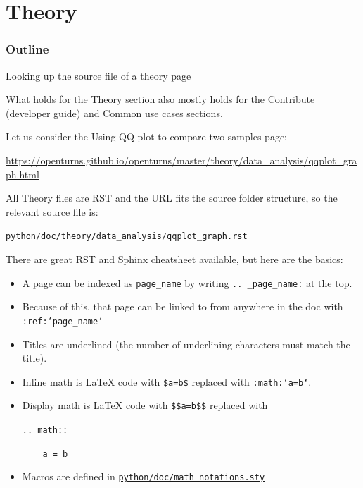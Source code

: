\documentclass[8pt, handout]{beamer}
\begin{document}
\section{Theory}

\begin{frame}[label=tableofcontents]
\frametitle{Outline}
\tableofcontents[currentsection]
\end{frame}


\begin{frame}{Looking up the source file of a theory page}

What holds for the \alert{Theory} section also mostly holds for the \alert{Contribute} (developer guide) and \alert{Common use cases} sections.

Let us consider the \alert{Using QQ-plot to compare two samples} page:

\url{https://openturns.github.io/openturns/master/theory/data_analysis/qqplot_graph.html}

All Theory files are RST and the URL fits the source folder structure, so the relevant source file is:

\href{https://github.com/openturns/openturns/blob/master/python/doc/theory/data_analysis/qqplot_graph.rst}{\texttt{python/doc/theory/data\_analysis/qqplot\_graph.rst}}

There are great RST and Sphinx \href{https://thomas-cokelaer.info/tutorials/sphinx/rest_syntax.html}{\alert{cheatsheet}} available,
but here are the basics:

\begin{itemize}
    \item A page can be \alert{indexed} as \texttt{page\_name} by writing \texttt{.. \_page\_name:} at the top.
    \item Because of this, that page can be \alert{linked} to from anywhere in the doc with \texttt{:ref:`page\_name`}
    \item \alert{Titles} are underlined (the number of underlining characters must match the title).
    \item \alert{Inline math} is \LaTeX{} code with \texttt{\$a=b\$} replaced with \texttt{:math:`a=b`}.
    \item \alert{Display math} is \LaTeX{} code with \texttt{\$\$a=b\$\$} replaced with
    
    \texttt{.. math::}
    
    \texttt{~~~~a = b}
    \item \alert{Macros} are defined in \href{https://github.com/openturns/openturns/blob/master/python/doc/math_notations.sty}{\texttt{python/doc/math\_notations.sty}}
\end{itemize}

\end{frame}
\end{document}
